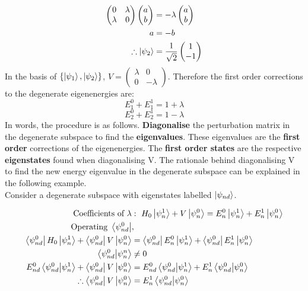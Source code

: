 \documentclass{article}
\begin{document}
\begin{flushleft}
\begin{align*}
    \begin{pmatrix}
        0 & \lambda\\
        \lambda & 0
    \end{pmatrix}
    \begin{pmatrix}
        a\\
        b
    \end{pmatrix}&=-\lambda\begin{pmatrix}
        a\\
        b
    \end{pmatrix}\\
    a&=-b\\
    \therefore \ket{\psi_2}&=\frac{1}{\sqrt{2}}\begin{pmatrix}
        1\\
        -1
    \end{pmatrix}
    \end{align*}
In the basis of $\{\ket{\psi_1},\ket{\psi_2}\}$, $V=\begin{pmatrix}
    \lambda & 0\\
    0 & -\lambda
\end{pmatrix}$. Therefore the first order corrections to the degenerate eigenenergies are:
$$E_1^0+E_1^1=1+\lambda$$
$$E_2^0+E_2^1=1-\lambda$$
In words, the procedure is as follows. \textbf{Diagonalise} the perturbation matrix in the degenerate subspace to find the \textbf{eigenvalues}. These eigenvalues are the \textbf{first order} corrections of the eigenenergies. The\textbf{ first order states} are the respective \textbf{eigenstates} found when diagonalising V. The rationale behind diagonalising V to find the new energy eigenvalue in the degenerate subspace can be explained in the following example.\\

Consider a degenerate subspace with eigenstates labelled $\ket{\psi_{nd}}$.

\begin{align*}
    \text{Coefficients of}\ \lambda&:\ H_0\ket{\psi_n^1}+V\ket{\psi_n^0}=E_n^0\ket{\psi_n^1}+E_n^1\ket{\psi_n^0}\\
    \text{Operating}\ \bra{\psi_{nd}^0}&,\\
    \bra{\psi_{nd}^0}H_0\ket{\psi_n^1}+\bra{\psi_{nd}^0}V\ket{\psi_n^0}&=\bra{\psi_{nd}^0}E_n^0\ket{\psi_n^1}+\bra{\psi_{nd}^0}E_n^1\ket{\psi_n^0}\\
    \bra{\psi_{nd}^0}\ket{\psi_n^n}&\neq 0\\
    E_{nd}^0\bra{\psi_{nd}^0}\ket{\psi_n^1}+\bra{\psi_{nd}^0}V\ket{\psi_n^0}&= E_{nd}^0\bra{\psi_{nd}^0}\ket{\psi_n^1}+E_n^1\bra{\psi_{nd}^0}\ket{\psi_n^0}\\
    \therefore\bra{\psi_{nd}^0}V\ket{\psi_n^0}&=E_n^1\bra{\psi_{nd}^0}\ket{\psi_n^0}
\end{align*}


\end{flushleft}
\end{document}

